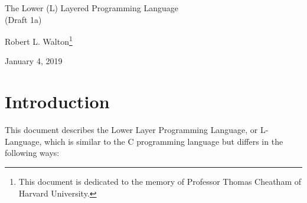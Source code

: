 \documentclass[12pt]{article}
\makeatletter
\renewcommand\tableofcontents{%
    \begin{list}{}%
	     {\setlength{\itemsep}{0in}%
	      \setlength{\topsep}{0in}%
	      \setlength{\parsep}{1ex}%
	      \setlength{\labelwidth}{0in}%
	      \setlength{\baselineskip}{1.5ex}%
	      \setlength{\leftmargin}{1.0in}%
	      \setlength{\rightmargin}{1.0in}}%
    \item\@starttoc{toc}%
    \end{list}}
\makeatother
\begin{document}
        
\begin{center}

{\Large
The Lower (L) Layered Programming Language \\[0.5ex]
(Draft 1a)}

\medskip

Robert L. Walton\footnote{This document is dedicated to the memory
of Professor Thomas Cheatham of Harvard University.}

January 4, 2019
 
\end{center}

{\small \tableofcontents}

\newpage

\section{Introduction}

This document describes the Lower Layer Programming Language, or
L-Language, which is similar to the C programming language
but differs in the following ways:
\end{document}
